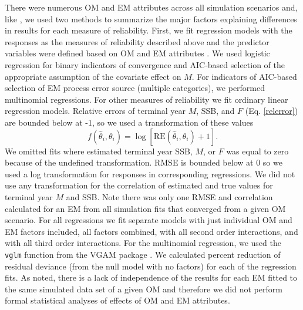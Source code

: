 \documentclass[
  12pt,
]{article}
\begin{document}
There were numerous OM and EM attributes across all simulation scenarios and, like \citet{milleretal_inreview1}, we used two methods to summarize the major factors explaining differences in results for each measure of reliability. First, we fit regression models with the responses as the measures of reliability described above and the predictor variables were defined based on OM and EM attributes \citep[e.g.,][]{mackinnonetal95, wangetal17, harwelletal18}. We used logistic regression for binary indicators of convergence and AIC-based selection of the appropriate assumption of the covariate effect on \(M\). For indicators of AIC-based selection of EM process error source (multiple categories), we performed multinomial regressions. For other measures of reliability we fit ordinary linear regression models. Relative errors of terminal year \(M\), SSB, and \(F\) (Eq. \ref{relerror}) are bounded below at -1, so we used a transformation of these values
\begin{equation}\label{relerror_trans_response}
f\left(\widehat \theta_i,\theta_i\right)  = \log\left[\text{RE}\left(\widehat \theta_i,\theta_i\right)+1\right].
\end{equation}
We omitted fits where estimated terminal year SSB, \(M\), or \(F\) was equal to zero because of the undefined transformation. RMSE is bounded below at 0 so we used a log transformation for responses in corresponding regressions. We did not use any transformation for the correlation of estimated and true values for terminal year \(M\) and SSB. Note there was only one RMSE and correlation calculated for an EM from all simulation fits that converged from a given OM scenario. For all regressions we fit separate models with just individual OM and EM factors included, all factors combined, with all second order interactions, and with all third order interactions. For the multinomial regression, we used the \verb|vglm| function from the VGAM package \citep{yee08, yee15}. We calculated percent reduction of residual deviance (from the null model with no factors) for each of the regression fits. As \citet{milleretal_inreview1} noted, there is a lack of independence of the results for each EM fitted to the same simulated data set of a given OM and therefore we did not perform formal statistical analyses of effects of OM and EM attributes.
\end{document}
